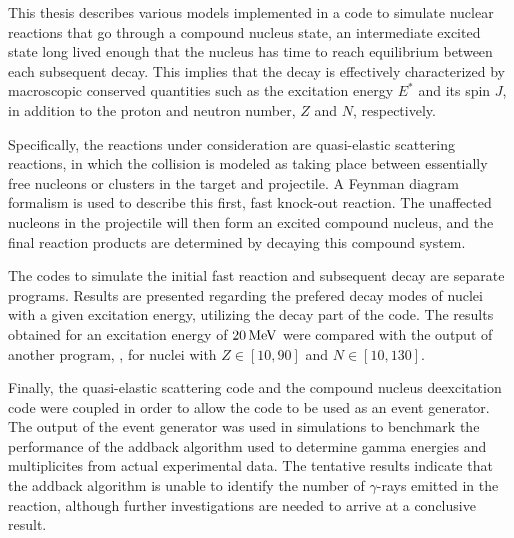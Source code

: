 This thesis describes various models implemented in a code to simulate nuclear reactions that go through a compound nucleus state, an intermediate excited state long lived enough that the nucleus has time to reach equilibrium between each subsequent decay. This implies that the decay is effectively characterized by macroscopic conserved quantities such as the excitation energy $E^*$ and its spin $J$, in addition to the proton and neutron number, $Z$ and $N$, respectively.

Specifically, the reactions under consideration are quasi-elastic scattering reactions, in which the collision is modeled as taking place between essentially free nucleons or clusters in the target and projectile. A Feynman diagram formalism is used to describe this first, fast knock-out reaction.
The unaffected nucleons in the projectile will then form an excited compound nucleus, and the final reaction products are determined by decaying this compound system. 

The codes to simulate the initial fast reaction and subsequent decay are separate programs. Results are presented regarding the prefered decay modes of nuclei with a given excitation energy, utilizing the decay part of the code. The results obtained for an excitation energy of $\unit[20]{MeV}$ were compared with the output of another program, , for nuclei with $Z\in [10,90]$ and $N \in [10,130]$. 

Finally, the quasi-elastic scattering code and the compound nucleus deexcitation code were coupled in order to allow the code to be used as an event generator. The output of the event generator was used in simulations to benchmark the performance of the addback algorithm used to determine gamma energies and multiplicites from actual experimental data. The tentative results indicate that the addback algorithm is unable to identify the number of $\gamma$-rays emitted in the reaction, although further investigations are needed to arrive at a conclusive result.
